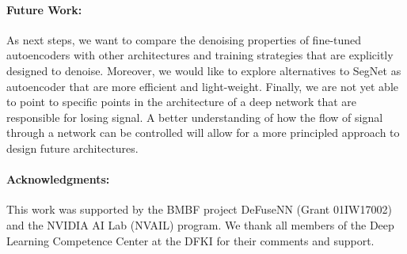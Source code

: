 \documentclass[10pt,twocolumn,a4paper]{article}
\begin{document}
\vspace{-1.5em}\paragraph{Future Work:}
As next steps, we want to compare the denoising properties of fine-tuned autoencoders with other architectures and training strategies that are explicitly designed to denoise.
Moreover, we would like to explore alternatives to SegNet as autoencoder that are more efficient and light-weight.
Finally, we are not yet able to point to specific points in the architecture of a deep network that are responsible for losing signal.
A better understanding of how the flow of signal through a network can be controlled will allow for a more principled approach to design future architectures.


\paragraph{Acknowledgments: }This work was supported by the BMBF project DeFuseNN (Grant 01IW17002) and the NVIDIA AI Lab (NVAIL) program.
We thank all members of the Deep Learning Competence Center at the DFKI for their comments and support.


{\small


}
\end{document}
